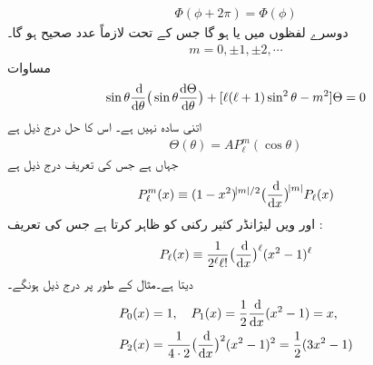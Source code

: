 \begin{align}
\Phi(\phi+2\pi)=\Phi(\phi) 
\end{align}
دوسرے لفظوں میں  یا  ہو گا جس کے تحت  لازماً عدد صحیح ہو گا۔
\begin{align}
m=0,\pm 1,\pm 2,\cdots
\end{align}
 مساوات  
\begin{align}\label{مساوات_ابعادی_تھیٹا_مساوات}
\sin{\theta}\frac{\dif}{\dif{\theta}}\big(\sin{\theta}\frac{\dif{\Theta}}{\dif{\theta}}\big)+[\ell(\ell+1)\sin^{2}{\theta}-m^{2}]\Theta=0 
\end{align}
اتنی سادہ نہیں ہے۔ اس کا حل درج ذیل ہے
\begin{align}
\Theta(\theta)=AP_{\ell}^{m}(\cos{\theta}) 
\end{align}
جہاں   ہے جس کی تعریف درج ذیل ہے
\begin{align}\label{مساوات_ابعادی_شریک_لیژانڈر_تفاعلات_تعریف}
P_{\ell}^{m}(x)\equiv (1-x^{2})^{\abs{m}/2}\big(\frac{\dif}{\dif{x}}\big)^{\abs{m}}P_{\ell}(x) 
\end{align}
اور  ویں لیژانڈر کثیر رکنی کو  ظاہر کرتا ہے جس کی تعریف :
\begin{align}\label{مساوات_ابعادی_روڈریگیس}
P_{\ell}(x)\equiv\frac{1}{2^{\ell}\ell!}\big(\frac{\dif}{\dif{x}}\big)^{\ell}(x^{2}-1)^{\ell} 
\end{align}
دیتا ہے۔مثال کے طور پر درج ذیل ہونگے۔
\begin{align*}
P_{0}(x)&=1,\quad P_{1}(x)=\frac{1}{2}\frac{\dif}{\dif{x}}(x^{2}-1)=x ,\\
P_{2}(x)&=\frac{1}{4\cdot 2}\big(\frac{\dif}{\dif{x}}\big)^{2}(x^{2}-1)^{2}=\frac{1}{2}(3x^{2}-1) 
\end{align*}
%

